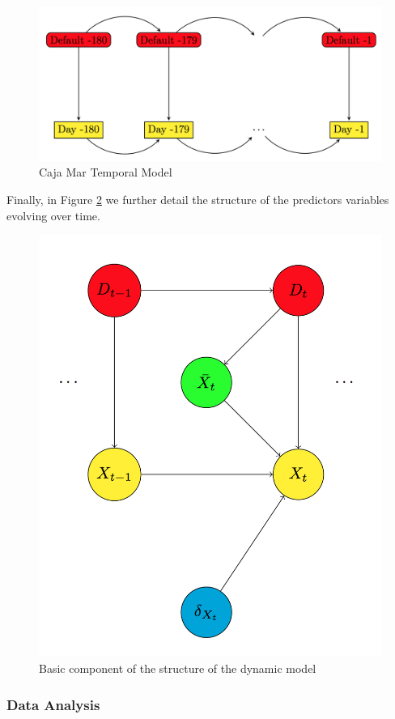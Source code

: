 \begin{figure}
\begin{center}
\caption{\label{Figure:CajaMarModel1}Caja Mar Temporal Model}
\includegraphics[scale=0.5]{./figures/CajaMarModel1}
\end{center}
\end{figure}


Finally, in Figure \ref{Figure:CajaMarModel2} we further detail the structure of the predictors variables evolving over time. 

\begin{figure}
\begin{center}
\caption{\label{Figure:CajaMarModel2} Basic component of the structure of the dynamic model}
\includegraphics[scale=0.5]{./figures/CajaMarModel2}
\end{center}
\end{figure}


\subsubsection*{Data Analysis}

